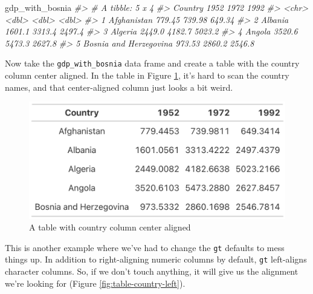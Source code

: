 \documentclass[
]{book}
\newenvironment{Shaded}{\begin{snugshade}}{\end{snugshade}}
\newcommand{\CommentTok}[1]{\textcolor[rgb]{0.56,0.35,0.01}{\textit{#1}}}
\newcommand{\NormalTok}[1]{#1}
\begin{document}
\begin{Shaded}
\begin{Highlighting}[]
\NormalTok{gdp\_with\_bosnia}
\CommentTok{\#\textgreater{} \# A tibble: 5 x 4}
\CommentTok{\#\textgreater{}   Country                 \textasciigrave{}1952\textasciigrave{}  \textasciigrave{}1972\textasciigrave{}  \textasciigrave{}1992\textasciigrave{}}
\CommentTok{\#\textgreater{}   \textless{}chr\textgreater{}                    \textless{}dbl\textgreater{}   \textless{}dbl\textgreater{}   \textless{}dbl\textgreater{}}
\CommentTok{\#\textgreater{} 1 Afghanistan             779.45  739.98  649.34}
\CommentTok{\#\textgreater{} 2 Albania                1601.1  3313.4  2497.4 }
\CommentTok{\#\textgreater{} 3 Algeria                2449.0  4182.7  5023.2 }
\CommentTok{\#\textgreater{} 4 Angola                 3520.6  5473.3  2627.8 }
\CommentTok{\#\textgreater{} 5 Bosnia and Herzegovina  973.53 2860.2  2546.8}
\end{Highlighting}
\end{Shaded}

Now take the \texttt{gdp\_with\_bosnia} data frame and create a table with the country column center aligned. In the table in Figure \ref{fig:table-country-centered}, it's hard to scan the country names, and that center-aligned column just looks a bit weird.

\begin{figure}
\includegraphics[width=1\linewidth]{nostarch/temp/F05007} \caption{A table with country column center aligned}\label{fig:table-country-centered}
\end{figure}

This is another example where we've had to change the \texttt{gt} defaults to mess things up. In addition to right-aligning numeric columns by default, \texttt{gt} left-aligns character columns. So, if we don't touch anything, it will give us the alignment we're looking for (Figure \ref{fig:table-country-left}).
\end{document}
